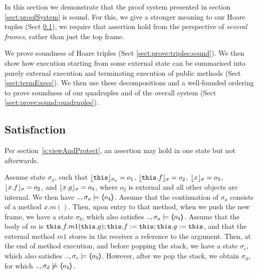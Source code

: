 

In this section we demonstrate that the proof system presented in section \ref{sect:proofSystem} is sound. 
For this, we give a stronger meaning to our Hoare tuples  (Sect \ref{s:scoped:valid}), we require  that   assertion hold from the perspective of \emph{several frames}, rather than just the top frame.

We prove soundness  of Hoare triples (Sect \ref{sect:prove:triples:sound}).
We then show how execution starting from some external state can be summarised into purely external execution and terminating execution of public methods (Sect \ref{sect:termExecs}). We then use these decompositions and a well-founded ordering to prove soundness of our quadruples  and of the overall system (Sect \ref{sect:prove:sound:quadruples}).


\subsection{\Scoped Satisfaction} 
\label{s:scoped:valid}


Per section~\ref{s:viewAndProtect}, an assertion may hold in one state
but not afterwards.

\begin{example}
\label{ex:motivate:scoped}
Assume state $\sigma_a$, such that $\interpret {\sigma_a} {\prg{this}}=o_1$, $\interpret {\sigma} {\prg{this}.f}=o_2$, $\interpret {\sigma} {x}=o_3$, $\interpret {\sigma} {x.f}=o_2$,  
and $\interpret {\sigma} {x.g}=o_4$, where $o_2$ is external and all other objects are internal. 
We then have $..,\sigma_a \models  \inside {o_4}$.
Assume that the continuation of $\sigma_a$   consists of a method $x.m()$. Then,
upon entry to that method, when we push the new frame, we have a state $\sigma_b$, which also satisfies $..,\sigma_a \models  \inside {o_4}$.
Assume that the   body of $m$ is $\prg{this}.f.m1(\prg{this}.g); \prg{this}.f := \prg{this};  \prg{this}.g := \prg{this}$, and that the external method $m1$ stores in the 
receiver a reference to the argument.
Then, at the end of method execution, and before popping the stack, we have a state $\sigma_c$, which also satisfies $..,\sigma_c \models  \inside {o_4}$.
However, after we pop the stack, we obtain $\sigma_d$, for which $..,\sigma_d \not\models  \inside {o_4}$.
\end{example}
 

